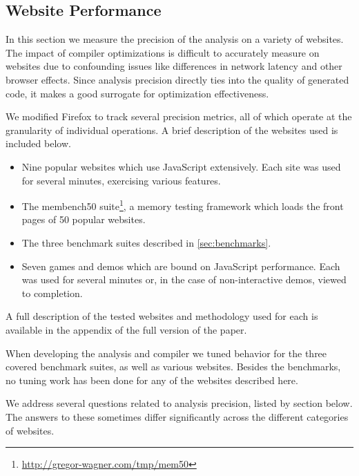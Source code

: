 \subsection{Website Performance}
\label{sec:websites}

In this section we measure the precision of the analysis
on a variety of websites.
The impact of compiler optimizations is difficult to accurately
measure on websites due to confounding issues like differences
in network latency and other browser effects.
Since analysis precision directly ties into the quality of
generated code, it makes a good surrogate for optimization effectiveness.

We modified Firefox to track several precision metrics,
all of which operate at the granularity of individual operations.
A brief description of the websites used is included below.

\begin{itemize}

\item Nine popular websites which use JavaScript extensively.
Each site was used for several minutes, exercising various features.

\item The membench50 suite\footnote{\url{http://gregor-wagner.com/tmp/mem50}},
a memory testing framework
which loads the front pages of 50 popular websites.

\item The three benchmark suites described in \Section\ref{sec:benchmarks}.

\item Seven games and demos which are bound on JavaScript performance.
Each was used for several minutes or, in the case of non-interactive
demos, viewed to completion.

\end{itemize}

A full description of the tested websites and methodology used for each
is available in the appendix of the full version of the paper.

When developing the analysis and compiler we tuned behavior for the three
covered benchmark suites, as well as various websites.
Besides the benchmarks, no tuning work has been done for any of the
websites described here.

We address several questions related to analysis precision,
listed by section below. The answers to these sometimes differ significantly
across the different categories of websites.

